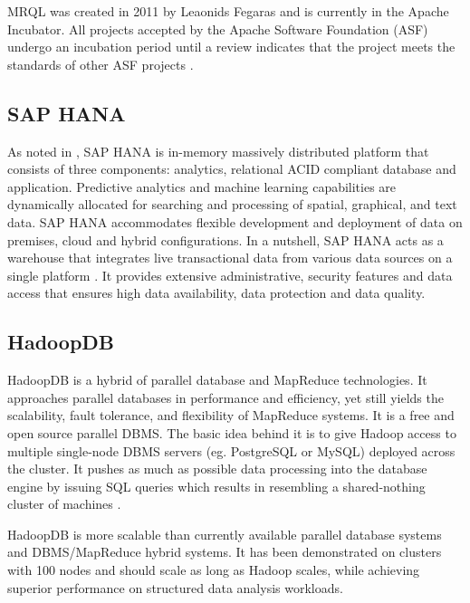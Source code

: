      MRQL was created in 2011 by Leaonids
     Fegaras \cite{www-mrqlhadoop} and is currently in the Apache
     Incubator.  All projects accepted by the Apache Software
     Foundation (ASF) undergo an incubation period until a review
     indicates that the project meets the standards of other ASF
     projects \cite{www-apacheincubator}.

\subsection{ SAP HANA}

     As noted in \cite{www-sap-hana}, SAP HANA is in-memory massively
     distributed platform that consists of three components:
     analytics, relational ACID compliant database and
     application. Predictive analytics and machine learning
     capabilities are dynamically allocated for searching and
     processing of spatial, graphical, and text data. 
     SAP HANA accommodates flexible development and deployment of 
     data on premises, cloud and hybrid configurations.  In a 
     nutshell, SAP HANA acts as a warehouse that integrates live 
     transactional data from various data sources on a single 
     platform \cite{olofson-2014}. It provides extensive 
     administrative, security features and data access that ensures 
     high data availability, data protection and data quality.
	 

\subsection{ HadoopDB}
    
     HadoopDB is a hybrid of parallel database and MapReduce
     technologies. It approaches parallel databases in performance and
     efficiency, yet still yields the scalability, fault tolerance,
     and flexibility of MapReduce systems. It is a free and open
     source parallel DBMS. The basic idea behind it is to give Hadoop
     access to multiple single-node DBMS servers (eg. PostgreSQL or
     MySQL) deployed across the cluster. It pushes as much as possible
     data processing into the database engine by issuing SQL queries
     which results in resembling a shared-nothing cluster of
     machines \cite{www-hadoopdb}.

     HadoopDB is more scalable than currently available parallel
     database systems and DBMS/MapReduce hybrid systems. It has been
     demonstrated on clusters with 100 nodes and should scale as long
     as Hadoop scales, while achieving superior performance on
     structured data analysis workloads.
     
